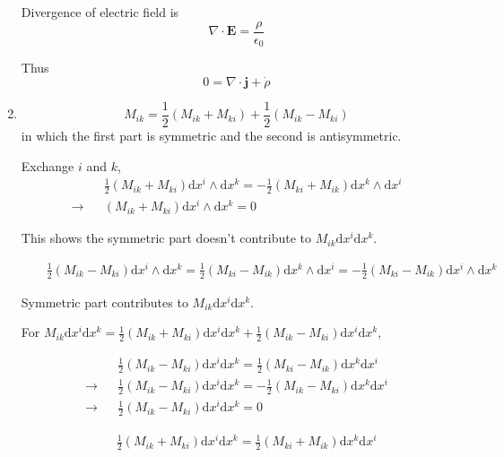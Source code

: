 \documentclass[12pt,a4paper]{article}
\begin{document}
\begin{enumerate}
Divergence of electric field is
\begin{equation}
	\nabla\cdot \bm E = \frac \rho {\epsilon_0}
\end{equation}

Thus
\begin{equation}
	0 = \nabla\cdot \bm j + \dot{\rho}
\end{equation}


\item

\begin{equation}
	M_{ik} = \frac{1}{2}(M_{ik} + M_{ki}) + \frac{1}{2}(M_{ik} - M_{ki})
\end{equation}
in which the first part is symmetric and the second is antisymmetric.

Exchange $i$ and $k$,
\begin{eqnarray*}
	&&\frac12 (M_{ik} + M_{ki})\mathrm dx^i\wedge \mathrm dx^k
	= -\frac12(M_{ki} + M_{ik})\mathrm dx^k\wedge \mathrm dx^i \\
	\rightarrow && (M_{ik} + M_{ki})\mathrm dx^i\wedge \mathrm dx^k = 0
\end{eqnarray*}

This shows the symmetric part doesn't contribute to $M_{ik}\mathrm dx^i\mathrm dx^k$.

\begin{eqnarray*}
	&&\frac12 (M_{ik} - M_{ki})\mathrm dx^i\wedge \mathrm dx^k
	= \frac12(M_{ki} - M_{ik})\mathrm dx^k\wedge \mathrm dx^i 
	= -\frac12(M_{ki} - M_{ik})\mathrm dx^i\wedge \mathrm dx^k
\end{eqnarray*}

Symmetric part contributes to $M_{ik}\mathrm dx^i\mathrm dx^k$.


For $M_{ik} \mathrm dx^i\mathrm dx^k = \frac{1}{2}(M_{ik} + M_{ki})\mathrm dx^i\mathrm dx^k + \frac{1}{2}(M_{ik} - M_{ki})\mathrm dx^i\mathrm dx^k$,

\begin{eqnarray*}
	&&\frac12 (M_{ik} - M_{ki})\mathrm dx^i \mathrm dx^k
	= \frac12(M_{ki} - M_{ik})\mathrm dx^k \mathrm dx^i \\
	\rightarrow && \frac12 (M_{ik} - M_{ki})\mathrm dx^i \mathrm dx^k
	= - \frac12(M_{ik} - M_{ki})\mathrm dx^k \mathrm dx^i \\
	\rightarrow && \frac12 (M_{ik} - M_{ki})\mathrm dx^i \mathrm dx^k =0
\end{eqnarray*}


\begin{eqnarray*}
	&&\frac12 (M_{ik} + M_{ki})\mathrm dx^i \mathrm dx^k
	= \frac12(M_{ki} + M_{ik})\mathrm dx^k \mathrm dx^i
\end{eqnarray*}


\end{enumerate}
\end{document}
